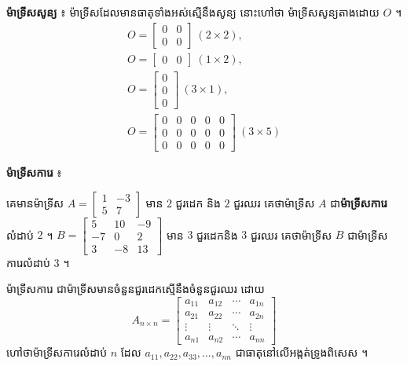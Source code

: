 \textbf{ម៉ាទ្រីសសូន្យ} ៖ ម៉ាទ្រីសដែលមានធាតុទាំងអស់ស្មើនឹងសូន្យ នោះហៅថា ម៉ាទ្រីសសូន្យតាងដោយ $O$ ។
\[
\begin{gathered}
O = \begin{bmatrix} 0 & 0\\ 0 & 0 \end{bmatrix} \ (2 \times 2),\\
O = \begin{bmatrix} 0 & 0 \end{bmatrix} \ (1 \times 2),\\
O = \begin{bmatrix} 0\\ 0\\ 0 \end{bmatrix} \ (3 \times 1),\\
O = \begin{bmatrix} 0 & 0 & 0 & 0 & 0\\ 0 & 0 & 0 & 0 & 0\\ 0 & 0 & 0 & 0 & 0 \end{bmatrix} \ (3 \times 5)
\end{gathered}
\]

\textbf{ម៉ាទ្រីសការេ} ៖
\begin{example}[ឧទាហរណ៍]
គេមានម៉ាទ្រីស $A = \begin{bmatrix} 1 & -3\\ 5 & 7 \end{bmatrix}$ មាន $2$ ជួរដេក និង $2$ ជួរឈរ គេថាម៉ាទ្រីស $A$ ជា\textbf{ម៉ាទ្រីសការេ}លំដាប់ $2$ ។ $B = \begin{bmatrix} 5 & 10 & -9\\ -7 & 0 & 2\\ 3 & -8 & 13 \end{bmatrix}$ មាន $3$ ជួរដេកនិង $3$ ជួរឈរ គេថាម៉ាទ្រីស $B$ ជាម៉ាទ្រីសការេលំដាប់ $3$ ។
\end{example}

\begin{formulaBox}[ជាទូទៅ]
ម៉ាទ្រីសការេ ជាម៉ាទ្រីសមានចំនួនជួរដេកស្មើនឹងចំនួនជួរឈរ ដោយ
\[ A_{n \times n} = \begin{bmatrix} a_{11} & a_{12} & \cdots & a_{1n}\\ a_{21} & a_{22} & \cdots & a_{2n}\\ \vdots & \vdots & \ddots & \vdots\\ a_{n1} & a_{n2} & \cdots & a_{nn} \end{bmatrix} \]
ហៅថាម៉ាទ្រីសការេលំដាប់ $n$ ដែល $a_{11}, a_{22}, a_{33}, \ldots, a_{nn}$ ជាធាតុនៅលើអង្កត់ទ្រូងពិសេស ។
\end{formulaBox}

